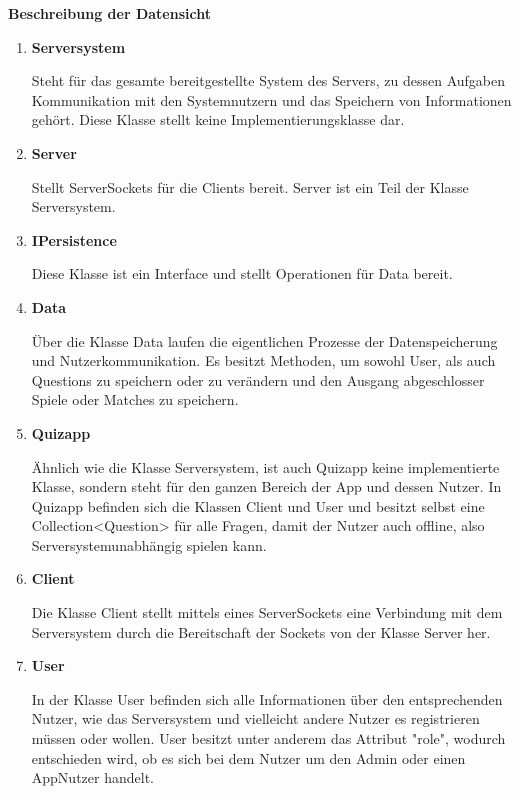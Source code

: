 \textbf{Beschreibung der Datensicht}

\begin{enumerate}
	\item{\textbf{Serversystem}}
	
	Steht für das gesamte bereitgestellte System des Servers, zu dessen Aufgaben Kommunikation mit den Systemnutzern und das Speichern
	von Informationen gehört. Diese Klasse stellt keine Implementierungsklasse dar.
	
	\item{\textbf{Server}}
	
	Stellt ServerSockets für die Clients bereit. Server ist ein Teil der Klasse Serversystem.
	
	\item{\textbf{IPersistence}}
	
	Diese Klasse ist ein Interface und stellt Operationen für Data bereit.
	
	\item{\textbf{Data}}
	
	Über die Klasse Data laufen die eigentlichen Prozesse der Datenspeicherung und Nutzerkommunikation. Es besitzt Methoden, um sowohl User, als auch
	Questions zu speichern oder zu verändern und den Ausgang abgeschlosser Spiele oder Matches zu speichern.
	
	\item{\textbf{Quizapp}}
	
	Ähnlich wie die Klasse Serversystem, ist auch Quizapp keine implementierte Klasse, sondern steht für den ganzen Bereich der App und dessen Nutzer.
	In Quizapp befinden sich die Klassen Client und User und besitzt selbst eine Collection<Question> für alle Fragen, damit der Nutzer auch offline, also 
	Serversystemunabhängig spielen kann.
	
	\item{\textbf{Client}}
	
	Die Klasse Client stellt mittels eines ServerSockets eine Verbindung mit dem Serversystem durch die Bereitschaft der Sockets von der Klasse Server her.
	
	\item{\textbf{User}}
	
	In der Klasse User befinden sich alle Informationen über den entsprechenden Nutzer, wie das Serversystem und vielleicht andere Nutzer es registrieren 
	müssen oder wollen. User besitzt unter anderem das Attribut "role", wodurch entschieden wird, ob es sich bei dem Nutzer um den Admin oder einen AppNutzer handelt.
	

\end{enumerate}
